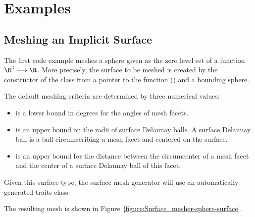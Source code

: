 
\def\ccLongParamLayout{\ccFalse}

\section{Examples}
\label{SurfaceMesher_section_example}


\subsection{Meshing an Implicit Surface}

The first code example meshes a sphere
given as the zero level set of a function $\R^3 \longrightarrow \R$.
More precisely,
the surface to be meshed is created
by the constructor
of the class 
from a pointer to the function ()
and a bounding sphere.

The default meshing criteria are determined  by three numerical
values:
\begin{itemize}
\item {} is a lower bound in degrees for the angles
     of mesh facets.
\item {} is an upper bound on the radii of surface Delaunay
balls. A surface Delaunay ball is a ball circumscribing a mesh facet
and centered on the surface.
\item {} is an upper bound for the distance
between the circumcenter of a mesh facet and the center of a surface
Delaunay ball of this facet.
\end{itemize}

Given this surface type, the surface mesh generator will use
an automatically generated traits class.

The resulting mesh is shown in
Figure~\ref{figure:Surface_mesher-sphere-surface}.

